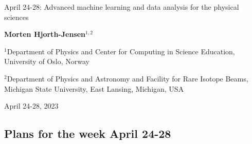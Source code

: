 \documentclass[%
oneside,                 %
final,                   %
10pt]{article}
\begin{document}

\newcommand{\exercisesection}[1]{\subsection*{#1}}






\thispagestyle{empty}

\begin{center}
{\LARGE\bf
\begin{spacing}{1.25}
April 24-28: Advanced machine learning and data analysis for the physical sciences
\end{spacing}
}
\end{center}


\begin{center}
{\bf Morten Hjorth-Jensen${}^{1, 2}$} \\ [0mm]
\end{center}

\begin{center}
\centerline{{\small ${}^1$Department of Physics and Center for Computing in Science Education, University of Oslo, Norway}}
\centerline{{\small ${}^2$Department of Physics and Astronomy and Facility for Rare Isotope Beams, Michigan State University, East Lansing, Michigan, USA}}
\end{center}
    

\begin{center}
April 24-28, 2023
\end{center}

\vspace{1cm}


\subsection*{Plans for the week April 24-28}


\end{document}
